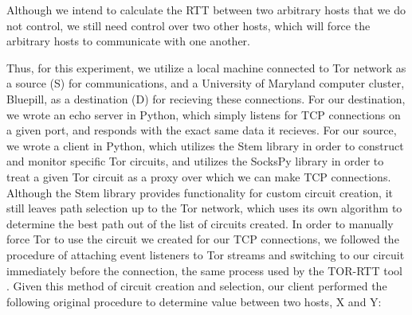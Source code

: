 \documentclass[twocolumn,11pt]{article}
\begin{document}
Although we intend to calculate the RTT between two arbitrary hosts that we do not control, we still need control over two other hosts, which will force the arbitrary hosts to communicate with one another. 

Thus, for this experiment, we utilize a local machine connected to Tor network as a source (S) for communications, and a University of Maryland computer cluster, Bluepill, as a destination (D) for recieving these connections. For our destination, we wrote an echo server in Python, which simply listens for TCP connections on a given port, and responds with the exact same data it recieves. For our source, we wrote a client in Python, which utilizes the Stem library in order to construct and monitor specific Tor circuits, and utilizes the SocksPy library in order to treat a given Tor circuit as a proxy over which we can make TCP connections. Although the Stem library provides functionality for custom circuit creation, it still leaves path selection up to the Tor network, which uses its own algorithm to determine the best path out of the list of circuits created. In order to manually force Tor to use the circuit we created for our TCP connections, we followed the procedure of attaching event listeners to Tor streams and switching to our circuit immediately before the connection, the same process used by the TOR-RTT tool \cite{Tor_RTT}. Given this method of circuit creation and selection, our client performed the following original procedure to determine value between two hosts, X and Y: 
\end{document}
